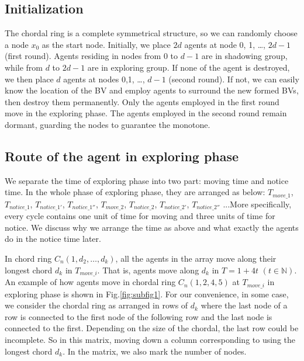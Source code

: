 \documentclass[conference]{IEEEtran}
\begin{document}
\subsection{Initialization }
The chordal ring is a complete symmetrical structure, so we can randomly choose a node $x_0$ as the start node. Initially, we place $2d$ agents at node 0, 1, \ldots , $2d-1$ (first round). Agents residing in nodes from $0$ to $d-1$ are in shadowing group, while from $d$ to $2d-1$ are in exploring group. If none of the agent is destroyed, we then place $d$ agents at nodes 0,1, \ldots, $d-1$ (second round). If not, we can easily know the location of the BV and employ agents to surround the new formed BVs, then destroy them permanently. Only the agents employed in the first round move in the exploring phase. The agents employed in the second round remain dormant, guarding the nodes to guarantee the monotone. \\

\subsection{Route of the agent in exploring phase}
We separate the time of exploring phase into two part: moving time and notice time. In the whole phase of exploring phase, they are arranged as below: $T_{move\_1}$, $T_{notice\_1}$, $T_{notice\_1'}$, $T_{notice\_1''}$, $T_{move\_2}$, $T_{notice\_2}$, $T_{notice\_2'}$, $T_{notice\_2''}$ ...More specifically, every cycle contains one unit of time for moving and three units of time for notice. We discuss why we arrange the time as above and what exactly the agents do in the notice time later. 

In chord ring $C_n(1, d_2, \ldots, d_k)$, all the agents in the array move along their longest chord $d_k$ in $T_{move\_i}$. That is, agents move along $d_k$ in $T=1+4t$ $(t\in \mathbb{N})$.  An example of how agents move in chordal ring $C_n(1, 2 , 4, 5)$ at $T_{move\_i}$ in exploring phase is shown in Fig.\ref{fig:subfig1}. For our convenience, in some case, we consider the chordal ring as arranged in rows of $d_k$ where the last node of a row is connected to the first node of the following row and the last node is connected to the first. Depending on the size of the chordal, the last row could be incomplete. So in this matrix, moving down a column corresponding to using the longest chord $d_k$. In the matrix, we also mark the number of nodes.\\
\end{document}
